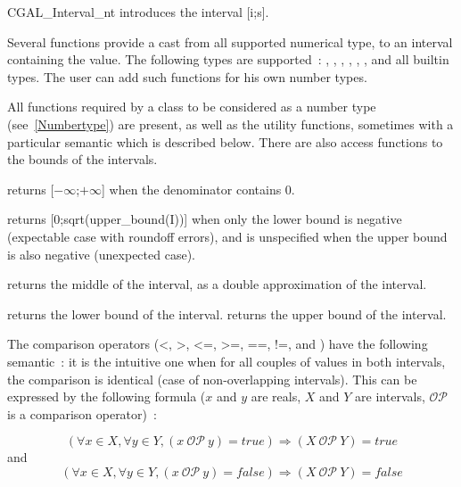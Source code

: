 \begin{ccClass} {CGAL_Interval_nt}
{introduces the interval [i;s].}

Several functions  provide a cast
from all supported numerical type, to an interval 
containing the value.  The following types are supported~: ,
, , , ,
, and all builtin types.
The user can add such functions for his own number types.


\ccOperations
{}

All functions required by a class to be considered as a {\cgal} number type
(see~\ref{Numbertype}) are present, as well as the utility functions,
sometimes with a particular semantic which is described below.  There are also
access functions to the bounds of the intervals.


 {returns
[$-\infty$;$+\infty$] when the denominator contains 0.}

 {returns
[0;sqrt(upper\_bound(I))] when only the lower bound is negative (expectable
case with roundoff errors), and is unspecified when the upper bound is also
negative (unexpected case).}

 {returns the
middle of the interval, as a double approximation of the interval.}

 {returns the lower bound of the interval.}
 {returns the upper bound of the interval.}

The comparison operators (<, >, <=, >=, ==, !=,  and
) have the following semantic~: it is the intuitive
one when for all couples of values in both intervals, the comparison
is identical (case of non-overlapping intervals).  This can be expressed
by the following formula ($x$ and $y$ are reals, $X$ and $Y$ are
intervals, $\mathcal{OP}$ is a comparison operator)~:

$$
\left(\forall x \in X, \forall y \in Y, (x\ \mathcal{OP}\ y) = true\right)
\Rightarrow (X\ \mathcal{OP}\ Y) = true
$$
and
$$
\left(\forall x \in X, \forall y \in Y, (x\ \mathcal{OP}\ y) = false\right)
\Rightarrow (X\ \mathcal{OP}\ Y) =false
$$


\end{ccClass}
